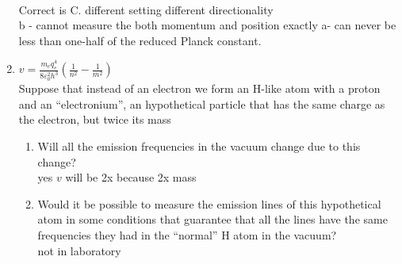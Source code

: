 \documentclass{article}
\begin{document}
\begin{enumerate}
\\Correct is C. different setting different directionality
\\b - cannot measure the both momentum and position exactly
a- can never be less than one-half of the reduced Planck constant.
\item $v=\frac{m_eq_e^4}{8\varepsilon_0^2h^3}\left(\frac{1}{n^2}-\frac{1}{m^2}\right)$ 
\\Suppose that instead of an electron we form an H-like atom with a proton and an
“electronium”, an hypothetical particle that has the same charge as the electron, but twice its
mass
    \begin{enumerate}
    \item Will all the emission frequencies in the vacuum change due to this change?
    \\ yes $v$ will be 2x because 2x mass
    \item Would it be possible to measure the emission lines of this hypothetical atom in some conditions that guarantee that all the lines have the same frequencies they had in the “normal” H atom in the vacuum?
    \\ not in laboratory
    \end{enumerate}

\end{enumerate}%
\end{document}

